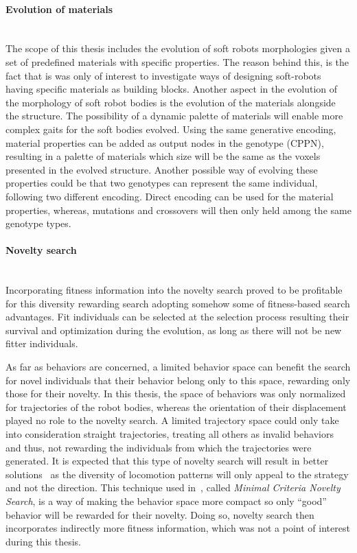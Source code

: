 \paragraph*{Evolution of materials}~\\
The scope of this thesis includes the evolution of soft robots morphologies given a set of predefined materials with specific properties. The reason behind this, is the fact that is was only of interest to investigate ways of designing soft-robots having specific materials as building blocks. Another aspect in the evolution of the morphology of soft robot bodies is the evolution of the materials alongside the structure. The possibility of a dynamic palette of materials will enable more complex gaits for the soft bodies evolved. Using the same generative encoding, material properties can be added as output nodes in the genotype (CPPN), resulting in a palette of materials which size will be the same as the voxels presented in the evolved structure. Another possible way of evolving these properties could be that two genotypes can represent the same individual, following two different encoding. Direct encoding can be used for the material properties, whereas, mutations and crossovers will then only held among the same genotype types.

\paragraph*{Novelty search}~\\
Incorporating fitness information into the novelty search proved to be profitable for this diversity rewarding search adopting somehow some of fitness-based search advantages. Fit individuals can be selected at the selection process resulting their survival and optimization during the evolution, as long as there will not be new fitter individuals.

As far as behaviors are concerned, a limited behavior space can benefit the search for novel individuals that their behavior belong only to this space, rewarding only those for their novelty. In this thesis, the space of behaviors was only normalized for trajectories of the robot bodies, whereas the orientation of their displacement played no role to the novelty search. A limited trajectory space could only take into consideration straight trajectories, treating all others as invalid behaviors and thus, not rewarding the individuals from which the trajectories were generated. It is expected that this type of novelty search will result in better solutions~\citep{lehman2011abandoning} as the diversity of locomotion patterns will only appeal to the strategy and not the direction. This technique used in~\citep{lehman2011abandoning}, called \emph{Minimal Criteria Novelty Search}, is a way of making the behavior space more compact so only ``good'' behavior will be rewarded for their novelty. Doing so, novelty search then incorporates indirectly more fitness information, which was not a point of interest during this thesis.